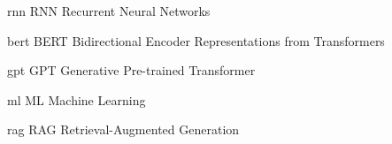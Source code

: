 \newabbreviation
    {rnn}
    {RNN}
    {Recurrent Neural Networks}
\newcommand{\rnn}{\gls{rnn}}

\newabbreviation
    {bert}
    {BERT}
    {Bidirectional Encoder Representations from Transformers}
\newcommand{\bert}{\gls{bert}}

\newabbreviation
    {gpt}
    {GPT}
    {Generative Pre-trained Transformer}
\newcommand{\gpt}{\gls{gpt}}

\newabbreviation
    {ml}
    {ML}
    {Machine Learning}
\newcommand{\mlearning}{\gls{ml}}

\newabbreviation
    {rag}
    {RAG}
    {Retrieval-Augmented Generation}
\newcommand{\rag}{\gls{rag}}
